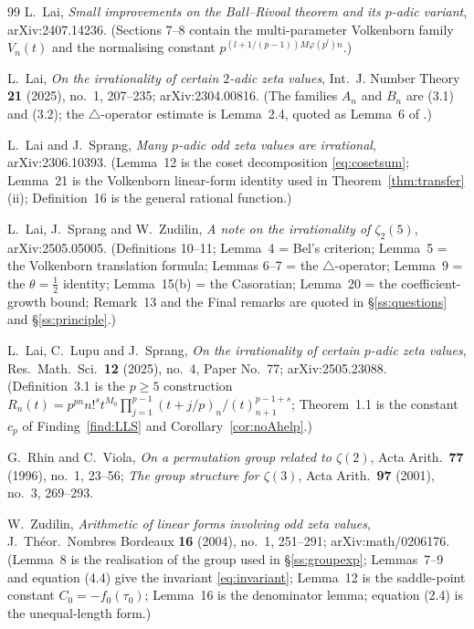 \begin{thebibliography}{99}
L.~Lai,
\emph{Small improvements on the Ball--Rivoal theorem and its $p$-adic variant},
arXiv:2407.14236.
(Sections 7--8 contain the multi-parameter Volkenborn family $V_n(t)$ and the
normalising constant $p^{(l+1/(p-1))M\varphi(p^l)n}$.)

L.~Lai,
\emph{On the irrationality of certain $2$-adic zeta values},
Int.\ J. Number Theory \textbf{21} (2025), no.~1, 207--235;
arXiv:2304.00816.
(The families $A_n$ and $B_n$ are (3.1) and (3.2); the $\triangle$-operator
estimate is Lemma~2.4, quoted as Lemma~6 of \cite{LSZ2025}.)

L.~Lai and J.~Sprang,
\emph{Many $p$-adic odd zeta values are irrational},
arXiv:2306.10393.
(Lemma~12 is the coset decomposition \eqref{eq:cosetsum}; Lemma~21 is the
Volkenborn linear-form identity used in Theorem~\ref{thm:transfer}(ii);
Definition~16 is the general rational function.)

L.~Lai, J.~Sprang and W.~Zudilin,
\emph{A note on the irrationality of $\zeta_2(5)$},
arXiv:2505.05005.
(Definitions 10--11; Lemma~4 = Bel's criterion; Lemma~5 = the Volkenborn
translation formula; Lemmas 6--7 = the $\triangle$-operator; Lemma~9 = the
$\theta=\tfrac12$ identity; Lemma~15(b) = the Casoratian; Lemma~20 = the
coefficient-growth bound; Remark~13 and the Final remarks are quoted in
\S\ref{ss:questions} and \S\ref{ss:principle}.)

L.~Lai, C.~Lupu and J.~Sprang,
\emph{On the irrationality of certain $p$-adic zeta values},
Res.\ Math.\ Sci.\ \textbf{12} (2025), no.~4, Paper No.~77;
arXiv:2505.23088.
(Definition~3.1 is the $p\ge5$ construction
$R_n(t)=p^{pn}n!^{s}t^{M_0}\prod_{j=1}^{p-1}(t+j/p)_n/(t)_{n+1}^{p-1+s}$;
Theorem~1.1 is the constant $c_p$ of Finding~\ref{find:LLS} and
Corollary~\ref{cor:noAhelp}.)

G.~Rhin and C.~Viola,
\emph{On a permutation group related to $\zeta(2)$},
Acta Arith.\ \textbf{77} (1996), no.~1, 23--56;
\emph{The group structure for $\zeta(3)$},
Acta Arith.\ \textbf{97} (2001), no.~3, 269--293.

W.~Zudilin,
\emph{Arithmetic of linear forms involving odd zeta values},
J.\ Th\'eor.\ Nombres Bordeaux \textbf{16} (2004), no.~1, 251--291;
arXiv:math/0206176.
(Lemma~8 is the realisation of the group used in \S\ref{ss:groupexp};
Lemmas~7--9 and equation (4.4) give the invariant \eqref{eq:invariant};
Lemma~12 is the saddle-point constant $C_0=-f_0(\tau_0)$; Lemma~16 is the
denominator lemma; equation (2.4) is the unequal-length form.)

\end{thebibliography}

